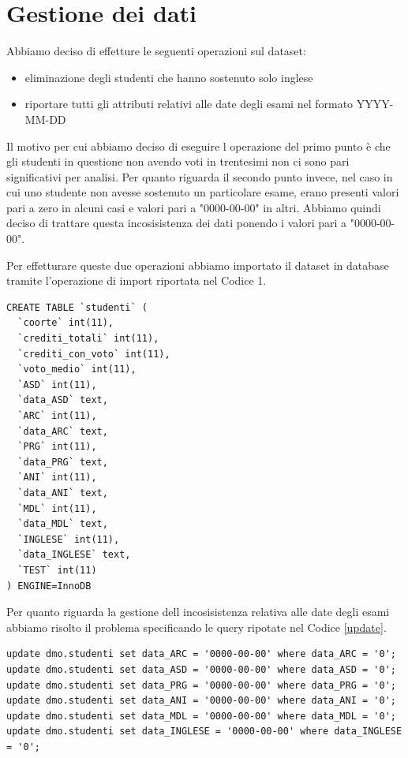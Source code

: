 \documentclass[12pt]{article}
\begin{document}
\section{Gestione dei dati}
Abbiamo deciso di effetture le seguenti operazioni sul dataset:
\begin{itemize}
	\item eliminazione degli studenti che hanno sostenuto solo inglese
	\item riportare tutti gli attributi relativi alle date degli esami nel formato YYYY-MM-DD
\end{itemize}
Il motivo per cui abbiamo deciso di eseguire l operazione del primo punto è che gli studenti in questione non avendo voti in trentesimi non ci sono pari significativi per analisi.
Per quanto riguarda il secondo punto invece, nel caso in cui uno studente non avesse sostenuto un particolare esame, erano presenti valori pari a zero in alcuni casi e valori pari a "0000-00-00" in altri.
Abbiamo quindi deciso di trattare questa incosisistenza dei dati ponendo i valori pari a "0000-00-00".

Per effetturare queste due operazioni abbiamo importato il dataset in database tramite l'operazione di import riportata nel Codice 1.
\begin{lstlisting}[caption={Creazione della table}, style=sql, label={import}]
CREATE TABLE `studenti` (
  `coorte` int(11),
  `crediti_totali` int(11),
  `crediti_con_voto` int(11),
  `voto_medio` int(11),
  `ASD` int(11),
  `data_ASD` text,
  `ARC` int(11),
  `data_ARC` text,
  `PRG` int(11),
  `data_PRG` text,
  `ANI` int(11),
  `data_ANI` text,
  `MDL` int(11),
  `data_MDL` text,
  `INGLESE` int(11),
  `data_INGLESE` text,
  `TEST` int(11)
) ENGINE=InnoDB
\end{lstlisting}
Per quanto riguarda la gestione dell incosisistenza relativa alle date degli esami abbiamo risolto il problema specificando le query ripotate nel Codice \ref{update}.

\begin{lstlisting}[caption={Update della tabella},style=sql, label={update}]
update dmo.studenti set data_ARC = '0000-00-00' where data_ARC = '0'; 
update dmo.studenti set data_ASD = '0000-00-00' where data_ASD = '0'; 
update dmo.studenti set data_PRG = '0000-00-00' where data_PRG = '0'; 
update dmo.studenti set data_ANI = '0000-00-00' where data_ANI = '0'; 
update dmo.studenti set data_MDL = '0000-00-00' where data_MDL = '0';
update dmo.studenti set data_INGLESE = '0000-00-00' where data_INGLESE = '0';
\end{lstlisting}
\end{document}
